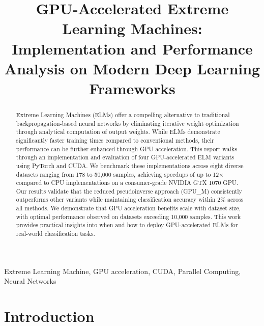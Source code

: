\documentclass[conference]{IEEEtran}
\begin{document}
\title{GPU-Accelerated Extreme Learning Machines: Implementation and Performance Analysis on Modern Deep Learning Frameworks}

\author{
\and
{}
}

\maketitle

\begin{abstract}
Extreme Learning Machines (ELMs) offer a compelling alternative to traditional backpropagation-based neural networks by eliminating iterative weight optimization through analytical computation of output weights. While ELMs demonstrate significantly faster training times compared to conventional methods, their performance can be further enhanced through GPU acceleration. This report walks through an implementation and evaluation of four GPU-accelerated ELM variants using PyTorch and CUDA. We benchmark these implementations across eight diverse datasets ranging from 178 to 50,000 samples, achieving speedups of up to 12× compared to CPU implementations on a consumer-grade NVIDIA GTX 1070 GPU. Our results validate that the reduced pseudoinverse approach (GPU\_M) consistently outperforms other variants while maintaining classification accuracy within 2\% across all methods. We demonstrate that GPU acceleration benefits scale  with dataset size, with optimal performance observed on datasets exceeding 10,000 samples. This work provides practical insights into when and how to deploy GPU-accelerated ELMs for real-world classification tasks.
\end{abstract}

\begin{IEEEkeywords}
Extreme Learning Machine, GPU acceleration, CUDA, Parallel Computing, Neural Networks
\end{IEEEkeywords}

\section{Introduction}
\end{document}
